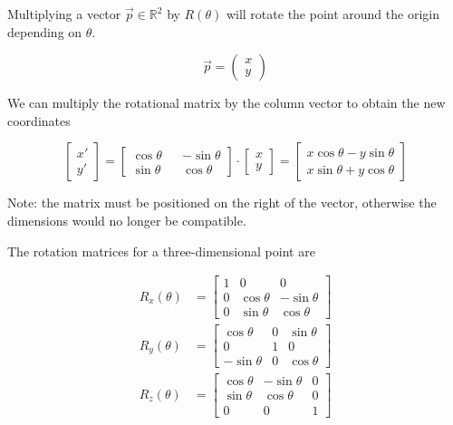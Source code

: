 \documentclass{article}
\begin{document}
Multiplying a vector \(\vec{p}\in \mathbb{R}^2\) by \(R(\theta)\) will rotate the point around the origin depending on \(\theta\).

\[
    \vec{p}=
    \begin{pmatrix} 
        x \\
        y
    \end{pmatrix}
\]

We can multiply the rotational matrix by the column vector to obtain the new coordinates

\[
    \begin{bmatrix} 
        x' \\
        y'
    \end{bmatrix}
    =
    \begin{bmatrix} 
        \cos\theta && -\sin\theta \\
        \sin\theta && \cos\theta
    \end{bmatrix}
    \cdot
    \begin{bmatrix} 
        x \\
        y
    \end{bmatrix}
    =
    \begin{bmatrix} 
        x\cos\theta - y\sin\theta \\
        x\sin\theta + y\cos\theta
    \end{bmatrix}
\]

Note: the matrix must be positioned on the right of the vector, otherwise the dimensions would no longer be compatible.

The rotation matrices for a three-dimensional point are

\begin{align*}
    R_x(\theta)&=
    \begin{bmatrix} 
        1 & 0 & 0 \\
        0 & \cos\theta & -\sin\theta \\
        0 & \sin\theta & \cos\theta
    \end{bmatrix}
    \\
    R_y(\theta)&=
    \begin{bmatrix} 
        \cos\theta & 0 & \sin\theta \\
        0 & 1 & 0 \\
        -\sin\theta & 0 & \cos\theta
    \end{bmatrix}
    \\
    R_z(\theta)&=
    \begin{bmatrix} 
        \cos\theta & -\sin\theta & 0 \\
        \sin\theta & \cos\theta & 0 \\
        0 & 0 & 1
    \end{bmatrix}
\end{align*}
\end{document}
